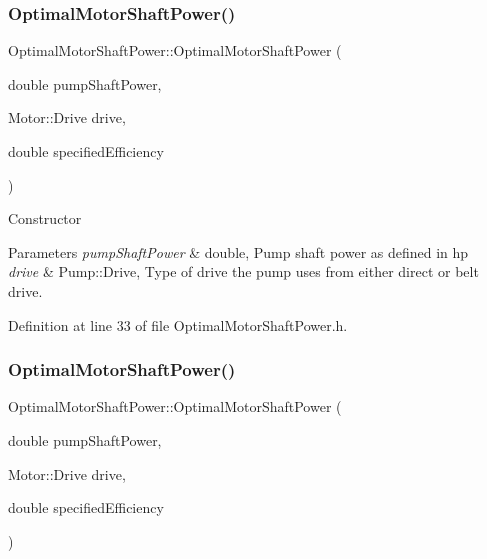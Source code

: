 \subsubsection{\texorpdfstring{Optimal\+Motor\+Shaft\+Power()}{OptimalMotorShaftPower()}\hspace{0.1cm}{\footnotesize\ttfamily [1/3]}}
{\footnotesize\ttfamily Optimal\+Motor\+Shaft\+Power\+::\+Optimal\+Motor\+Shaft\+Power (\begin{DoxyParamCaption}\item[{double}]{pump\+Shaft\+Power,  }\item[{Motor\+::\+Drive}]{drive,  }\item[{double}]{specified\+Efficiency }\end{DoxyParamCaption})\hspace{0.3cm}{\ttfamily [inline]}}

Constructor 
\begin{DoxyParams}{Parameters}
{\em pump\+Shaft\+Power} & double, Pump shaft power as defined in hp \\
\hline
{\em drive} & Pump\+::\+Drive, Type of drive the pump uses from either direct or belt drive. \\
\hline
\end{DoxyParams}


Definition at line 33 of file Optimal\+Motor\+Shaft\+Power.\+h.

\mbox{\label{class_optimal_motor_shaft_power_ad830e1f8a7931e3c6bec5f8828d57e83}} 
\subsubsection{\texorpdfstring{Optimal\+Motor\+Shaft\+Power()}{OptimalMotorShaftPower()}\hspace{0.1cm}{\footnotesize\ttfamily [2/3]}}
{\footnotesize\ttfamily Optimal\+Motor\+Shaft\+Power\+::\+Optimal\+Motor\+Shaft\+Power (\begin{DoxyParamCaption}\item[{double}]{pump\+Shaft\+Power,  }\item[{Motor\+::\+Drive}]{drive,  }\item[{double}]{specified\+Efficiency }\end{DoxyParamCaption})\hspace{0.3cm}{\ttfamily [inline]}}


